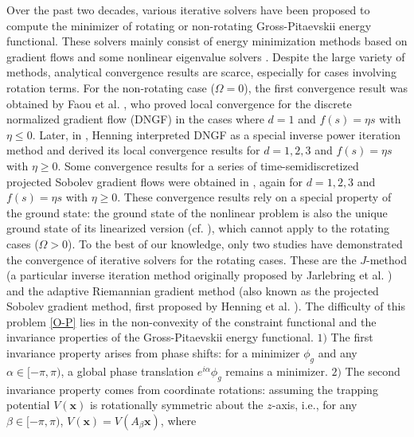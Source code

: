 \documentclass[preprint,3p]{elsarticle}
\begin{document}
Over the past two decades, various iterative solvers have been proposed to compute the minimizer of rotating or non-rotating Gross-Pitaevskii energy functional. These solvers mainly consist of energy minimization methods based on gradient flows \cite{2014Robust, 2017Efficient, 2003Computing, 2006Efficient, 2023Second, 2024On, 2000Ground, 2010A, 2017Computation, 2001Optimi, 2020Sobolev, 2023The, 2010Tackling, 2021Normalized, 2017A, 2024Anew, 2022Exp, 2019Efficient} and some nonlinear eigenvalue solvers \cite{2021The, 2007Dion, 2023The, 2014An}. Despite the large variety of methods, analytical convergence results are scarce, especially for cases involving rotation terms. For the non-rotating case ($\Omega = 0$), the first convergence result was obtained by Faou et al. \cite{2017Convergence}, who proved local convergence for the discrete normalized gradient flow (DNGF) in the cases where \(d = 1\) and $f(s)=\eta s$ with \(\eta \leq 0\). Later, in \cite{2023The}, Henning interpreted DNGF as a special inverse power iteration method and derived its local convergence results for \(d = 1, 2, 3\) and $f(s)=\eta s$ with \(\eta \geq 0\). Some convergence results for a series of time-semidiscretized projected Sobolev gradient flows were obtained in \cite{2024On, 2020Sobolev, 2023The, 2022Exp}, again for \(d = 1, 2, 3\) and $f(s)=\eta s$ with \(\eta \geq 0\). These convergence results rely on a special property of the ground state: the ground state of the nonlinear problem is also the unique ground state of its linearized version (cf. \cite{2010Numerical}), which cannot apply to the rotating cases ($\Omega>0$). To the best of our knowledge, only two studies have demonstrated the convergence of iterative solvers for the rotating cases. These are the $J$-method \cite{2021The} (a particular inverse iteration method originally proposed by Jarlebring et al. \cite{2014An}) and the adaptive Riemannian gradient method \cite{2024Convergence} (also known as the projected Sobolev gradient method, first proposed by Henning et al. \cite{2020Sobolev}). The difficulty of this problem \eqref{O-P} lies in the non-convexity of the constraint functional and the invariance properties of the Gross-Pitaevskii energy functional. 
\noindent $1)$ The first invariance property arises from phase shifts: for a minimizer \(\phi_g\) and any \(\alpha \in [-\pi, \pi)\), a global phase translation \(e^{i\alpha}\phi_g\) remains a minimizer. $2)$ The second invariance property comes from coordinate rotations: assuming the trapping potential \(V(\bm{x})\) is rotationally symmetric about the $z$-axis, i.e., for any \(\beta \in [-\pi, \pi)\), \(V(\bm{x})=V(A_{\beta}\bm{x})\), where
\end{document}
